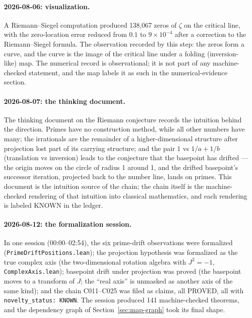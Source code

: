 \documentclass[sigplan,10pt,anonymous,review]{acmart}
\begin{document}
\paragraph{2026-08-06: visualization.} A Riemann--Siegel computation
produced 138{,}067 zeros of $\zeta$ on the critical line, with the
zero-location error reduced from $0.1$ to $9 \times 10^{-4}$ after a
correction to the Riemann--Siegel formula. The observation recorded by
this step: the zeros form a curve, and the curve is the image of the
critical line under a folding (inversion-like) map. The numerical record
is observational; it is not part of any machine-checked statement, and
the map labels it as such in the numerical-evidence section.

\paragraph{2026-08-07: the thinking document.} The thinking document on
the Riemann conjecture records the intuition behind the direction. Primes
have no construction method, while all other numbers have many; the
irrationals are the remainder of a higher-dimensional structure after
projection lost part of its carrying structure; and the pair $1$ vs
$1/a + 1/b$ (translation vs inversion) leads to the conjecture that the
basepoint has drifted --- the origin moves on the circle of radius 1
around 1, and the drifted basepoint's successor iteration, projected back
to the number line, lands on primes. This document is the intuition
source of the chain; the chain itself is the machine-checked rendering of
that intuition into classical mathematics, and each rendering is labeled
KNOWN in the ledger.

\paragraph{2026-08-12: the formalization session.} In one session
(00:00--02:54), the six prime-drift observations were formalized
(\texttt{PrimeDriftPositions.lean}); the projection hypothesis was
formalized as the true complex axis (the two-dimensional rotation algebra
with $J^2 = -1$, \texttt{ComplexAxis.lean}); basepoint drift under
projection was proved (the basepoint moves to a transform of $J$; the
``real axis'' is unmasked as another axis of the same kind); and the
chain C011--C025 was filed as claims, all PROVED, all with
\texttt{novelty\_status: KNOWN}. The session produced 141 machine-checked
theorems, and the dependency graph of Section~\ref{sec:map-graph} took
its final shape.
\end{document}

